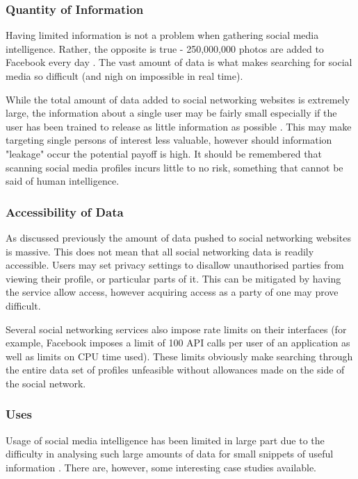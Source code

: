 \documentclass[12pt]{article}
\begin{document}
\subsubsection{Quantity of Information}
Having limited information is not a problem when gathering social media intelligence. Rather, the opposite is true - 250,000,000 photos are added to Facebook every day \citep{socmintoverview}. The vast amount of data is what makes searching for social media so difficult (and nigh on impossible in real time).

While the total amount of data added to social networking websites is extremely large, the information about a single user may be fairly small especially if the user has been trained to release as little information as possible \citep{behaviourdetection}. This may make targeting single persons of interest less valuable, however should information "leakage" occur the potential payoff is high. It should be remembered that scanning social media profiles incurs little to no risk, something that cannot be said of human intelligence.

\subsubsection{Accessibility of Data}
As discussed previously the amount of data pushed to social networking websites is massive. This does not mean that all social networking data is readily accessible. Users may set privacy settings to disallow unauthorised parties from viewing their profile, or particular parts of it. This can be mitigated by having the service allow access, however acquiring access as a party of one may prove difficult.

Several social networking services also impose rate limits on their interfaces (for example, Facebook imposes a limit of 100 API calls per user of an application as well as limits on CPU time used). These limits obviously make searching through the entire data set of profiles unfeasible without allowances made on the side of the social network. 

\subsubsection{Uses}
Usage of social media intelligence has been limited in large part due to the difficulty in analysing such large amounts of data for small snippets of useful information \citep{socmintoverview}. There are, however, some interesting case studies available.
\end{document}
